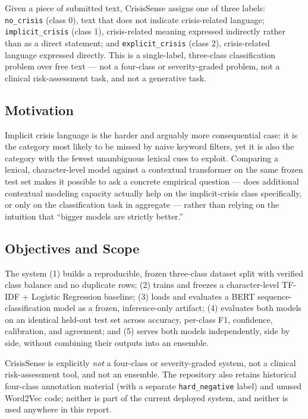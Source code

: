 \documentclass[12pt,a4paper]{article}
\begin{document}
Given a piece of submitted text, CrisisSense assigns one of three labels: \texttt{no\_crisis} (class 0), text that does not indicate crisis-related language; \texttt{implicit\_crisis} (class 1), crisis-related meaning expressed indirectly rather than as a direct statement; and \texttt{explicit\_crisis} (class 2), crisis-related language expressed directly. This is a single-label, three-class classification problem over free text --- not a four-class or severity-graded problem, not a clinical risk-assessment task, and not a generative task.

\subsection{Motivation}

Implicit crisis language is the harder and arguably more consequential case: it is the category most likely to be missed by naive keyword filters, yet it is also the category with the fewest unambiguous lexical cues to exploit. Comparing a lexical, character-level model against a contextual transformer on the same frozen test set makes it possible to ask a concrete empirical question --- does additional contextual modeling capacity actually help on the implicit-crisis class specifically, or only on the classification task in aggregate --- rather than relying on the intuition that ``bigger models are strictly better.''

\subsection{Objectives and Scope}

The system (1) builds a reproducible, frozen three-class dataset split with verified class balance and no duplicate rows; (2) trains and freezes a character-level TF-IDF + Logistic Regression baseline; (3) loads and evaluates a BERT sequence-classification model as a frozen, inference-only artifact; (4) evaluates both models on an identical held-out test set across accuracy, per-class F1, confidence, calibration, and agreement; and (5) serves both models independently, side by side, without combining their outputs into an ensemble.

CrisisSense is explicitly \emph{not} a four-class or severity-graded system, not a clinical risk-assessment tool, and not an ensemble. The repository also retains historical four-class annotation material (with a separate \texttt{hard\_negative} label) and unused Word2Vec code; neither is part of the current deployed system, and neither is used anywhere in this report.
\end{document}
